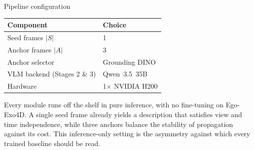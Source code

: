 \documentclass[professionalfonts,aspectratio=169]{beamer}
\begin{document}
\begin{frame}[t]
\begin{center}
{\large Pipeline configuration}
\end{center}
\vfill
\begin{center}
\small
\setlength{\tabcolsep}{8pt}
\begin{tabular}{ll}
  \toprule
  Component & Choice \\
  \midrule
  Seed frames $\lvert{\textit{S}}\rvert$ & 1 \\
  Anchor frames $\lvert{\textit{A}}\rvert$ & 3 \\
  Anchor selector & Grounding DINO \\
  VLM backend (Stages 2 \& 3) & Qwen~3.5~35B \\
  Hardware & 1$\times$ NVIDIA H200 \\
  \bottomrule
\end{tabular}
\end{center}
\vspace{0.8em}
\begin{center}
\begin{minipage}{0.88\textwidth}
\small
Every module runs off the shelf in pure inference, with no fine-tuning on Ego-Exo4D. A single seed frame already yields a description that satisfies view and time independence, while three anchors balance the stability of propagation against its cost. This inference-only setting is the asymmetry against which every trained baseline should be read.
\end{minipage}
\end{center}
\vfill
\end{frame}

\end{document}
